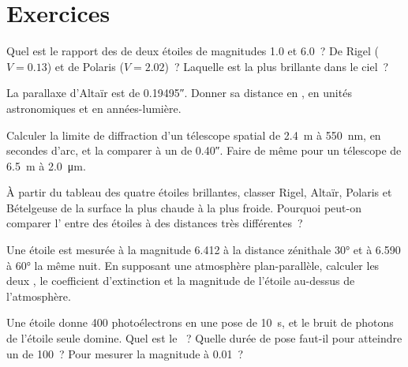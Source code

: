 \section{Exercices}

\begin{exercise}[$\star$]\label{exo:b1:observing-the-sky:1}
Quel est le rapport des  de deux étoiles de magnitudes 1.0 et 6.0~? De
Rigel ($V = 0.13$) et de Polaris ($V = 2.02$)~? Laquelle est la plus brillante
dans le ciel~?
\end{exercise}

\begin{exercise}[$\star$]\label{exo:b1:observing-the-sky:2}
La parallaxe d'Altaïr est de \ang{;;0.19495}. Donner sa distance en , en
unités astronomiques et en années-lumière.
\end{exercise}

\begin{exercise}[$\star$]\label{exo:b1:observing-the-sky:3}
Calculer la limite de diffraction d'un télescope spatial de \qty{2.4}{m} à
\qty{550}{nm}, en secondes d'arc, et la comparer à un  de
\ang{;;0.40}. Faire de même pour un télescope de \qty{6.5}{m} à
\qty{2.0}{\micro\metre}.
\end{exercise}

\begin{exercise}[$\star$]\label{exo:b1:observing-the-sky:4}
À partir du tableau des quatre étoiles brillantes, classer Rigel, Altaïr,
Polaris et Bételgeuse de la surface la plus chaude à la plus froide. Pourquoi
peut-on comparer l' entre des étoiles à des distances très
différentes~?
\end{exercise}

\begin{exercise}[$\star\star$]\label{exo:b1:observing-the-sky:5}
Une étoile est mesurée à la magnitude 6.412 à la distance zénithale \ang{30}
et à 6.590 à \ang{60} la même nuit. En supposant une atmosphère
plan-parallèle, calculer les deux , le coefficient d'extinction et
la magnitude de l'étoile au-dessus de l'atmosphère.
\end{exercise}

\begin{exercise}[$\star\star$]\label{exo:b1:observing-the-sky:6}
Une étoile donne 400 photoélectrons en une pose de \qty{10}{s}, et le bruit de
photons de l'étoile seule domine. Quel est le ~?
Quelle durée de pose faut-il pour atteindre un  de
100~? Pour mesurer la magnitude à \num{0.01}~?
\end{exercise}

